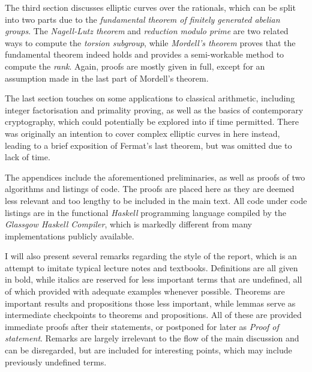 \documentclass{article}
\theoremstyle{definition}
\begin{document}
The third section discusses elliptic curves over the rationals, which can be split into two parts due to the \emph{fundamental theorem of finitely generated abelian groups}. The \emph{Nagell-Lutz theorem} and \emph{reduction modulo prime} are two related ways to compute the \emph{torsion subgroup}, while \emph{Mordell's theorem} proves that the fundamental theorem indeed holds and provides a semi-workable method to compute the \emph{rank}. Again, proofs are mostly given in full, except for an assumption made in the last part of Mordell's theorem.

The last section touches on some applications to classical arithmetic, including integer factorisation and primality proving, as well as the basics of contemporary cryptography, which could potentially be explored into if time permitted. There was originally an intention to cover complex elliptic curves in here instead, leading to a brief exposition of Fermat's last theorem, but was omitted due to lack of time.

The appendices include the aforementioned preliminaries, as well as proofs of two algorithms and listings of code. The proofs are placed here as they are deemed less relevant and too lengthy to be included in the main text. All code under code listings are in the functional \emph{Haskell} programming language compiled by the \emph{Glassgow Haskell Compiler}, which is markedly different from many implementations publicly available.

I will also present several remarks regarding the style of the report, which is an attempt to imitate typical lecture notes and textbooks. Definitions are all given in bold, while italics are reserved for less important terms that are undefined, all of which provided with adequate examples whenever possible. Theorems are important results and propositions those less important, while lemmas serve as intermediate checkpoints to theorems and propositions. All of these are provided immediate proofs after their statements, or postponed for later as \emph{Proof of \emph{statement}}. Remarks are largely irrelevant to the flow of the main discussion and can be disregarded, but are included for interesting points, which may include previously undefined terms.
\end{document}

